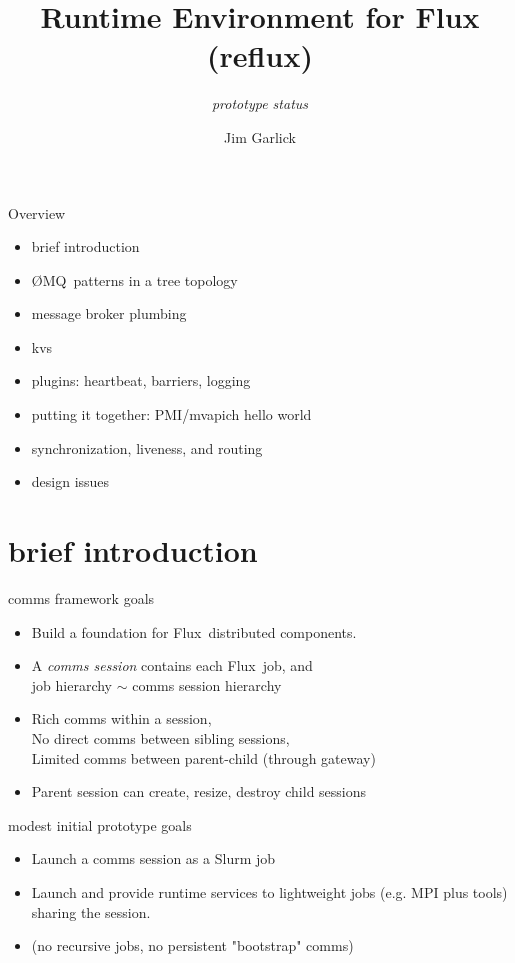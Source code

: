 \documentclass[default,pdf,colorBG,slideColor]{prosper}
\title{Runtime Environment for Flux (reflux)}
\subtitle{{\small {\em prototype status}}}
\author{Jim Garlick}
\newcommand{\ngrm}{Flux}
\newcommand{\zMQ}{\O{}MQ}
\begin{document}
\maketitle

\begin{slide}{Overview}{\small
\begin{itemize}
  \item{brief introduction}
  \item{\zMQ\ patterns in a tree topology}
  \item{message broker plumbing}
  \item{kvs}
  \item{plugins: heartbeat, barriers, logging}
  \item{putting it together: PMI/mvapich hello world}
  \item{synchronization, liveness, and routing}
  \item{design issues}
\end{itemize}
}\end{slide}

\part{brief introduction}

\begin{slide}{comms framework goals}{\small
\begin{itemize}
  \item{Build a foundation for \ngrm\ distributed components.}
  \item{A {\em comms session} contains each \ngrm\ job, and \\
	job hierarchy $\sim$ comms session hierarchy}
  \item{Rich comms within a session,\\
	No direct comms between sibling sessions,\\
        Limited comms between parent-child (through gateway)}
  \item{Parent session can create, resize, destroy child sessions}
\end{itemize}
}\end{slide}

\begin{slide}{modest initial prototype goals}{\small
\begin{itemize}
  \item{Launch a comms session as a Slurm job}
  \item{Launch and provide runtime services to
        lightweight jobs (e.g. MPI plus tools) sharing the session.}
  \item{(no recursive jobs, no persistent "bootstrap" comms)}
\end{itemize}
}\end{slide}
\end{document}
